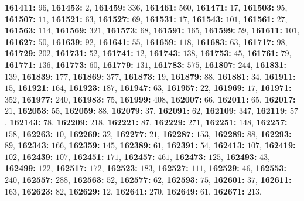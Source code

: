 \textsf{\bfseries 161411:} $96$, \textsf{\bfseries 161453:} $2$, \textsf{\bfseries 161459:} $336$, \textsf{\bfseries 161461:} $560$, \textsf{\bfseries 161471:} $17$, \textsf{\bfseries 161503:} $95$, \textsf{\bfseries 161507:} $11$, \textsf{\bfseries 161521:} $63$, \textsf{\bfseries 161527:} $69$, \textsf{\bfseries 161531:} $17$, \textsf{\bfseries 161543:} $101$, \textsf{\bfseries 161561:} $27$, \textsf{\bfseries 161563:} $114$, \textsf{\bfseries 161569:} $321$, \textsf{\bfseries 161573:} $68$, \textsf{\bfseries 161591:} $165$, \textsf{\bfseries 161599:} $59$, \textsf{\bfseries 161611:} $101$, \textsf{\bfseries 161627:} $50$, \textsf{\bfseries 161639:} $92$, \textsf{\bfseries 161641:} $55$, \textsf{\bfseries 161659:} $118$, \textsf{\bfseries 161683:} $63$, \textsf{\bfseries 161717:} $98$, \textsf{\bfseries 161729:} $202$, \textsf{\bfseries 161731:} $52$, \textsf{\bfseries 161741:} $12$, \textsf{\bfseries 161743:} $138$, \textsf{\bfseries 161753:} $45$, \textsf{\bfseries 161761:} $79$, \textsf{\bfseries 161771:} $136$, \textsf{\bfseries 161773:} $60$, \textsf{\bfseries 161779:} $131$, \textsf{\bfseries 161783:} $575$, \textsf{\bfseries 161807:} $244$, \textsf{\bfseries 161831:} $139$, \textsf{\bfseries 161839:} $177$, \textsf{\bfseries 161869:} $377$, \textsf{\bfseries 161873:} $19$, \textsf{\bfseries 161879:} $88$, \textsf{\bfseries 161881:} $34$, \textsf{\bfseries 161911:} $15$, \textsf{\bfseries 161921:} $164$, \textsf{\bfseries 161923:} $187$, \textsf{\bfseries 161947:} $63$, \textsf{\bfseries 161957:} $22$, \textsf{\bfseries 161969:} $17$, \textsf{\bfseries 161971:} $352$, \textsf{\bfseries 161977:} $240$, \textsf{\bfseries 161983:} $75$, \textsf{\bfseries 161999:} $408$, \textsf{\bfseries 162007:} $66$, \textsf{\bfseries 162011:} $65$, \textsf{\bfseries 162017:} $21$, \textsf{\bfseries 162053:} $55$, \textsf{\bfseries 162059:} $88$, \textsf{\bfseries 162079:} $37$, \textsf{\bfseries 162091:} $62$, \textsf{\bfseries 162109:} $347$, \textsf{\bfseries 162119:} $57$, \textsf{\bfseries 162143:} $78$, \textsf{\bfseries 162209:} $218$, \textsf{\bfseries 162221:} $87$, \textsf{\bfseries 162229:} $271$, \textsf{\bfseries 162251:} $148$, \textsf{\bfseries 162257:} $158$, \textsf{\bfseries 162263:} $10$, \textsf{\bfseries 162269:} $32$, \textsf{\bfseries 162277:} $21$, \textsf{\bfseries 162287:} $153$, \textsf{\bfseries 162289:} $88$, \textsf{\bfseries 162293:} $89$, \textsf{\bfseries 162343:} $166$, \textsf{\bfseries 162359:} $145$, \textsf{\bfseries 162389:} $61$, \textsf{\bfseries 162391:} $54$, \textsf{\bfseries 162413:} $107$, \textsf{\bfseries 162419:} $102$, \textsf{\bfseries 162439:} $107$, \textsf{\bfseries 162451:} $171$, \textsf{\bfseries 162457:} $461$, \textsf{\bfseries 162473:} $125$, \textsf{\bfseries 162493:} $43$, \textsf{\bfseries 162499:} $122$, \textsf{\bfseries 162517:} $172$, \textsf{\bfseries 162523:} $183$, \textsf{\bfseries 162527:} $111$, \textsf{\bfseries 162529:} $46$, \textsf{\bfseries 162553:} $240$, \textsf{\bfseries 162557:} $288$, \textsf{\bfseries 162563:} $52$, \textsf{\bfseries 162577:} $62$, \textsf{\bfseries 162593:} $75$, \textsf{\bfseries 162601:} $37$, \textsf{\bfseries 162611:} $163$, \textsf{\bfseries 162623:} $82$, \textsf{\bfseries 162629:} $12$, \textsf{\bfseries 162641:} $270$, \textsf{\bfseries 162649:} $61$, \textsf{\bfseries 162671:} $213$, 
